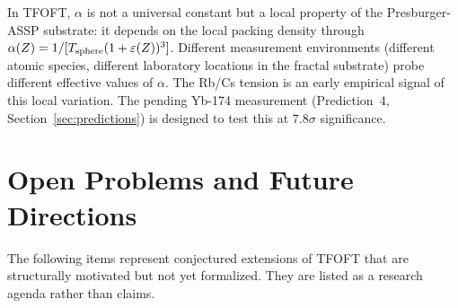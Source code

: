\documentclass[11pt,a4paper]{article}
\begin{document}
In TFOFT, $\alpha$ is not a universal constant but a local property of the Presburger-ASSP substrate: it depends on the local packing density through $\alpha(Z) = 1/[T_{\rm sphere}(1+\varepsilon(Z))^3]$. Different measurement environments (different atomic species, different laboratory locations in the fractal substrate) probe different effective values of $\alpha$. The Rb/Cs tension is an early empirical signal of this local variation. The pending Yb-174 measurement (Prediction~4, Section~\ref{sec:predictions}) is designed to test this at $7.8\sigma$ significance.


\section{Open Problems and Future Directions}
\label{sec:todo}

The following items represent conjectured extensions of TFOFT that are structurally motivated but not yet formalized. They are listed as a research agenda rather than claims.
\end{document}
